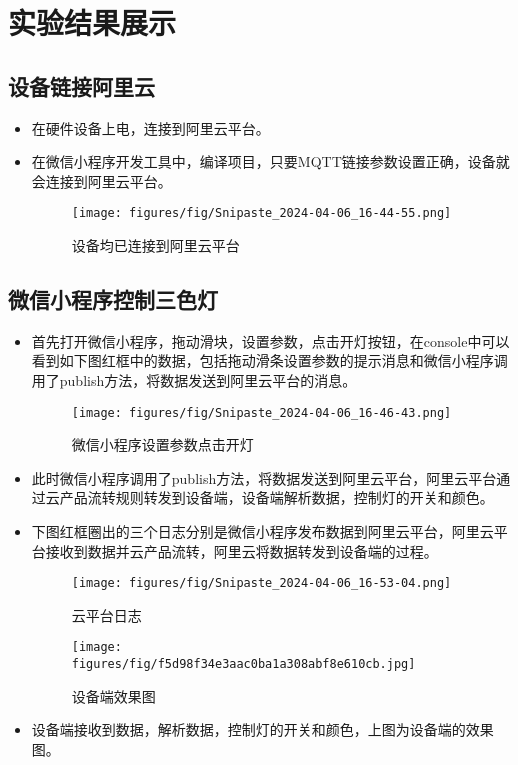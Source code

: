 \documentclass[12pt,hyperref,a4paper,UTF8]{ctexart}
\begin{document}
\section{实验结果展示}
\subsection{设备链接阿里云}
\begin{itemize}
  \item 在硬件设备上电，连接到阿里云平台。
  \item 在微信小程序开发工具中，编译项目，只要MQTT链接参数设置正确，设备就会连接到阿里云平台。
  \begin{figure}[H]
    \centering
    \texttt{[image: figures/fig/Snipaste\_2024-04-06\_16-44-55.png]}
    \caption{设备均已连接到阿里云平台}
    \label{fig:enter-label}
  \end{figure}
\end{itemize}

\subsection{微信小程序控制三色灯}
\begin{itemize}
  \item 首先打开微信小程序，拖动滑块，设置参数，点击开灯按钮，在console中可以看到如下图红框中的数据，包括拖动滑条设置参数的提示消息和微信小程序调用了publish方法，将数据发送到阿里云平台的消息。
  \begin{figure}[H]
    \centering
    \texttt{[image: figures/fig/Snipaste\_2024-04-06\_16-46-43.png]}
    \caption{微信小程序设置参数点击开灯}
    \label{fig:enter-label}
  \end{figure}
  \item 此时微信小程序调用了publish方法，将数据发送到阿里云平台，阿里云平台通过云产品流转规则转发到设备端，设备端解析数据，控制灯的开关和颜色。
  \item 下图红框圈出的三个日志分别是微信小程序发布数据到阿里云平台，阿里云平台接收到数据并云产品流转，阿里云将数据转发到设备端的过程。
  \begin{figure}[H]
    \centering
    \texttt{[image: figures/fig/Snipaste\_2024-04-06\_16-53-04.png]}
    \caption{云平台日志}
    \label{fig:enter-label}
  \end{figure}
 
  \begin{figure}[H]
    \centering
    \texttt{[image: figures/fig/f5d98f34e3aac0ba1a308abf8e610cb.jpg]}
    \caption{设备端效果图}
    \label{fig:enter-label}
  \end{figure}
  \item 设备端接收到数据，解析数据，控制灯的开关和颜色，上图为设备端的效果图。
\end{itemize}
\end{document}
